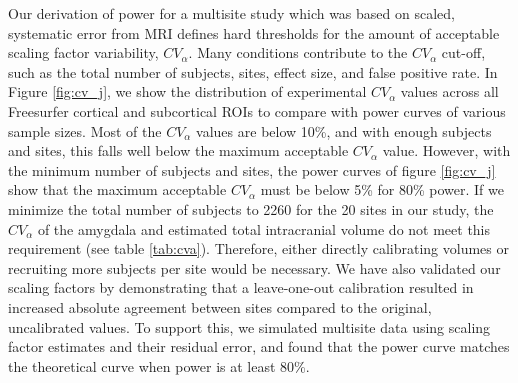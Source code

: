 Our derivation of power for a multisite study which was based on scaled, systematic error from MRI defines hard thresholds for the amount of acceptable scaling factor variability, $CV_{\alpha}$. Many conditions contribute to the $CV_{\alpha}$ cut-off, such as the total number of subjects, sites, effect size, and false positive rate. In Figure \ref{fig:cv_j}, we show the distribution of experimental $CV_{\alpha}$ values across all Freesurfer cortical and subcortical ROIs to compare with power curves of various sample sizes. Most of the $CV_{\alpha}$ values are below 10\%, and with enough subjects and sites, this falls well below the maximum acceptable $CV_{\alpha}$ value. However, with the minimum number of subjects and sites, the power curves of figure \ref{fig:cv_j} show that the maximum acceptable $CV_{\alpha}$ must be below 5\% for 80\% power. If we minimize the total number of subjects to 2260 for the 20 sites in our study, the $CV_{\alpha}$ of the amygdala and estimated total intracranial volume do not meet this requirement (see table \ref{tab:cva}). Therefore, either directly calibrating volumes or recruiting more subjects per site  would be necessary. We have also validated our scaling factors by demonstrating that a leave-one-out calibration resulted in increased absolute agreement between sites compared to the original, uncalibrated values. To support this, we simulated multisite data using scaling factor estimates and their residual error, and found that the power curve matches the theoretical curve when power is at least 80\%.